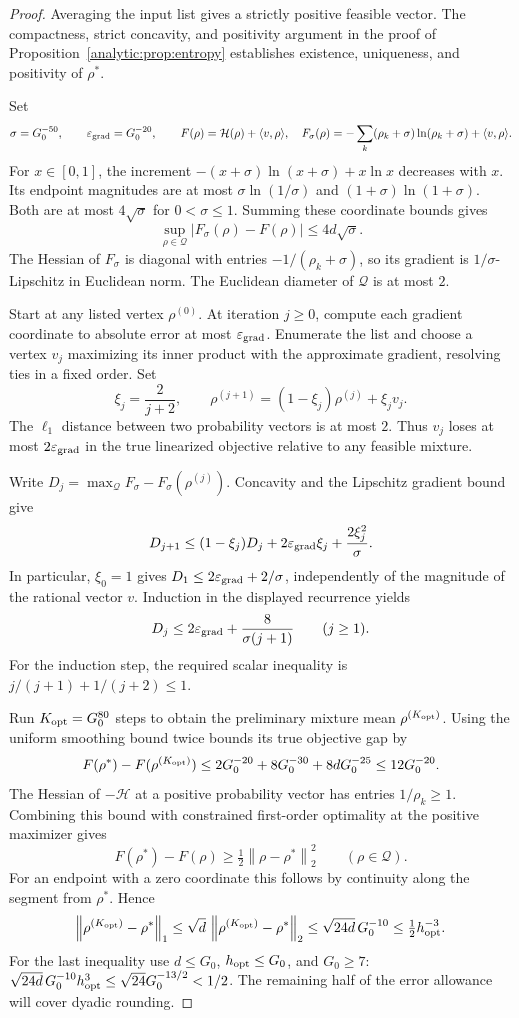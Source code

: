 \documentclass[11pt]{article}
\theoremstyle{definition}
\newcommand{\norm}[1]{\left\lVert#1\right\rVert}
\newcommand{\1}{\mathbf 1}
\newcommand{\HH}{\mathcal H}
\newcommand{\QQ}{\mathcal Q}
\newcommand{\ip}[2]{\langle #1,#2\rangle}
\begin{document}
\begin{proof}
Averaging the input list gives a strictly positive feasible vector.
The compactness, strict concavity, and positivity argument in the
proof of Proposition~\ref{analytic:prop:entropy} establishes existence,
uniqueness, and positivity of $\rho^*$.

Set
\[
 \sigma=G_0^{-50},\qquad \varepsilon_{\rm grad}=G_0^{-20},\qquad
 F(\rho)=\HH(\rho)+\ip v{\rho},
 \quad
 F_\sigma(\rho)=-\sum_k(\rho_k+\sigma)\ln(\rho_k+\sigma)+\ip v{\rho}.
\]
For $x\in[0,1]$, the increment
$-(x+\sigma)\ln(x+\sigma)+x\ln x$ decreases with $x$.
Its endpoint magnitudes are at most
$\sigma\ln(1/\sigma)$ and $(1+\sigma)\ln(1+\sigma)$.
Both are at most $4\sqrt{\sigma}$ for $0<\sigma\le1$.
Summing these coordinate bounds gives
\[
 \sup_{\rho\in\QQ}|F_\sigma(\rho)-F(\rho)|\le4d\sqrt{\sigma}.
\]
The Hessian of $F_\sigma$ is diagonal with entries
$-1/(\rho_k+\sigma)$, so its gradient is $1/\sigma$-Lipschitz
in Euclidean norm. The Euclidean diameter of $\QQ$ is at most $2$.

Start at any listed vertex $\rho^{(0)}$. At iteration $j\ge0$, compute each
gradient coordinate to absolute error at most $\varepsilon_{\rm grad}$. Enumerate the list
and choose a vertex $v_j$ maximizing its inner product with the
approximate gradient, resolving ties in a fixed order. Set
\[
 \xi_j=\frac2{j+2},\qquad
 \rho^{(j+1)}=(1-\xi_j)\rho^{(j)}+\xi_j v_j.
\]
The $\ell_1$ distance between two probability vectors is at most $2$.
Thus $v_j$ loses at most $2\varepsilon_{\rm grad}$ in the true linearized objective relative
to any feasible mixture.

Write $D_j=\max_{\QQ}F_\sigma-F_\sigma(\rho^{(j)})$.
Concavity and the Lipschitz gradient bound give
\[
 D_{j+1}\le(1-\xi_j)D_j+2\varepsilon_{\rm grad}\xi_j+\frac{2\xi_j^2}{\sigma}.
\]
In particular, $\xi_0=1$ gives $D_1\le2\varepsilon_{\rm grad}+2/\sigma$,
independently of the magnitude of the rational vector $v$.
Induction in the displayed recurrence yields
\[
 D_j\le2\varepsilon_{\rm grad}+\frac8{\sigma(j+1)}\qquad(j\ge1).
\]
For the induction step, the required scalar inequality is
$j/(j+1)+1/(j+2)\le1$.

Run $K_{\rm opt}=G_0^{80}$ steps to obtain the preliminary mixture mean $\rho^{(K_{\rm opt})}$.
Using the uniform smoothing bound twice bounds its true objective gap by
\[
 F(\rho^*)-F(\rho^{(K_{\rm opt})})
 \le2G_0^{-20}+8G_0^{-30}+8dG_0^{-25}
 \le12G_0^{-20}.
\]
The Hessian of $-\HH$ at a positive probability vector has entries
$1/\rho_k\ge1$. Combining this bound with constrained first-order
optimality at the positive maximizer gives
\[
 F(\rho^*)-F(\rho)\ge\tfrac12\norm{\rho-\rho^*}_2^2
 \qquad(\rho\in\QQ).
\]
For an endpoint with a zero coordinate this follows by continuity along
the segment from $\rho^*$. Hence
\[
 \norm{\rho^{(K_{\rm opt})}-\rho^*}_1
 \le\sqrt d\,\norm{\rho^{(K_{\rm opt})}-\rho^*}_2
 \le\sqrt{24d}\,G_0^{-10}\le \tfrac12 h_{\rm opt}^{-3}.
\]
For the last inequality use $d\le G_0$, $h_{\rm opt}\le G_0$, and $G_0\ge7$:
$\sqrt{24d}\,G_0^{-10}h_{\rm opt}^3\le\sqrt{24}G_0^{-13/2}<1/2$.
The remaining half of the error allowance will cover dyadic rounding.


\end{proof}
\end{document}

